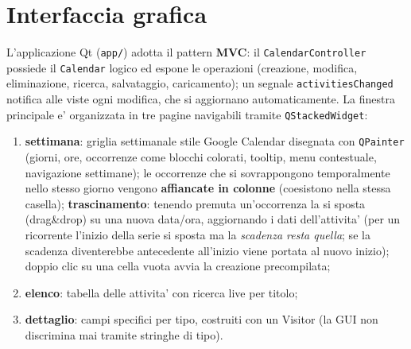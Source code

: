 \documentclass[10pt,a4paper]{article}
\begin{document}
\section{Interfaccia grafica}

L'applicazione Qt (\texttt{app/}) adotta il pattern \textbf{MVC}: il
\texttt{CalendarController} possiede il \texttt{Calendar} logico ed espone le
operazioni (creazione, modifica, eliminazione, ricerca, salvataggio,
caricamento); un segnale \texttt{activitiesChanged} notifica alle viste ogni
modifica, che si aggiornano automaticamente. La finestra principale e'
organizzata in tre pagine navigabili tramite \texttt{QStackedWidget}:

\begin{enumerate}[nosep]
  \item \textbf{settimana}: griglia settimanale stile Google Calendar disegnata
    con \texttt{QPainter} (giorni, ore, occorrenze come blocchi colorati, tooltip,
    menu contestuale, navigazione settimane); le occorrenze che si sovrappongono
    temporalmente nello stesso giorno vengono \textbf{affiancate in colonne}
    (coesistono nella stessa casella); \textbf{trascinamento}: tenendo premuta
    un'occorrenza la si sposta (drag\&drop) su una nuova data/ora, aggiornando i
    dati dell'attivita' (per un ricorrente l'inizio della serie si sposta ma la
    \emph{scadenza resta quella}; se la scadenza diventerebbe antecedente
    all'inizio viene portata al nuovo inizio); doppio clic su una cella vuota
    avvia la creazione precompilata;
  \item \textbf{elenco}: tabella delle attivita' con ricerca live per titolo;
  \item \textbf{dettaglio}: campi specifici per tipo, costruiti con un Visitor
    (la GUI non discrimina mai tramite stringhe di tipo).
\end{enumerate}
\end{document}
